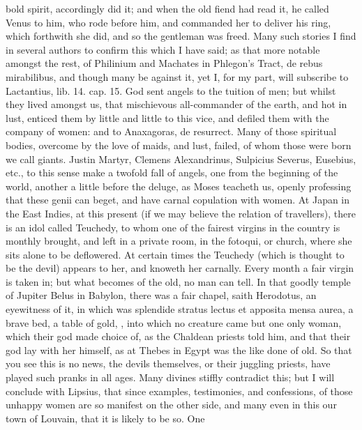 {bold spirit, accordingly did it; and when the old fiend had read it, he
called Venus to him, who rode before him, and commanded her to deliver
his ring, which forthwith she did, and so the gentleman was freed. Many
such stories I find in several authors to confirm this which I
have said; as that more notable amongst the rest, of Philinium and
Machates in Phlegon's Tract, de rebus mirabilibus, and though
many be against it, yet I, for my part, will subscribe to Lactantius,
lib. 14. cap. 15. God sent angels to the tuition of men; but
whilst they lived amongst us, that mischievous all-commander of the
earth, and hot in lust, enticed them by little and little to this vice,
and defiled them with the company of women: and to Anaxagoras, de
resurrect. Many of those spiritual bodies, overcome by the love
of maids, and lust, failed, of whom those were born we call giants.
Justin Martyr, Clemens Alexandrinus, Sulpicius Severus, Eusebius, etc.,
to this sense make a twofold fall of angels, one from the beginning of
the world, another a little before the deluge, as Moses teacheth us,
openly professing that these genii can beget, and have carnal
copulation with women. At Japan in the East Indies, at this present (if
we may believe the relation of travellers), there is an idol
called Teuchedy, to whom one of the fairest virgins in the country is
monthly brought, and left in a private room, in the fotoqui, or church,
where she sits alone to be deflowered. At certain times the
Teuchedy (which is thought to be the devil) appears to her, and knoweth
her carnally. Every month a fair virgin is taken in; but what becomes
of the old, no man can tell. In that goodly temple of Jupiter Belus in
Babylon, there was a fair chapel, saith Herodotus, an eyewitness
of it, in which was splendide stratus lectus et apposita mensa aurea, a
brave bed, a table of gold, \etc{}, into which no creature came but one
only woman, which their god made choice of, as the Chaldean priests
told him, and that their god lay with her himself, as at Thebes in
Egypt was the like done of old. So that you see this is no news, the
devils themselves, or their juggling priests, have played such pranks
in all ages. Many divines stiffly contradict this; but I will conclude
with Lipsius, that since examples, testimonies, and confessions,
of those unhappy women are so manifest on the other side, and many even
in this our town of Louvain, that it is likely to be so. One
}
